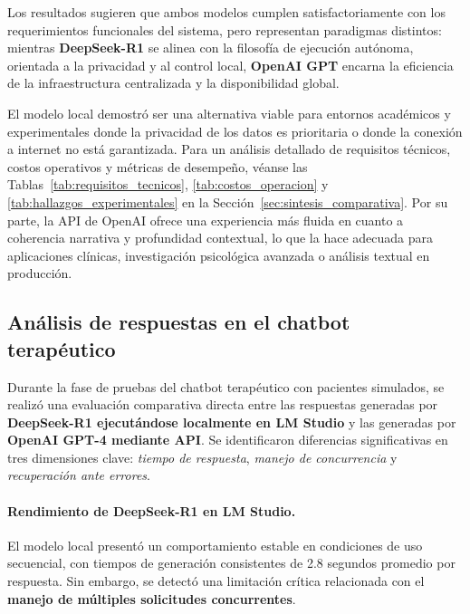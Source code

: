 \documentclass[12pt,a4paper]{report}
\numberwithin{figure}{section}
\begin{document}
Los resultados sugieren que ambos modelos cumplen satisfactoriamente con los requerimientos funcionales del sistema, pero representan paradigmas distintos:  
mientras \textbf{DeepSeek-R1} se alinea con la filosofía de ejecución autónoma, orientada a la privacidad y al control local, \textbf{OpenAI GPT} encarna la eficiencia de la infraestructura centralizada y la disponibilidad global.

El modelo local demostró ser una alternativa viable para entornos académicos y experimentales donde la privacidad de los datos es prioritaria o donde la conexión a internet no está garantizada. Para un análisis detallado de requisitos técnicos, costos operativos y métricas de desempeño, véanse las Tablas~\ref{tab:requisitos_tecnicos}, \ref{tab:costos_operacion} y \ref{tab:hallazgos_experimentales} en la Sección~\ref{sec:sintesis_comparativa}.  
Por su parte, la API de OpenAI ofrece una experiencia más fluida en cuanto a coherencia narrativa y profundidad contextual, lo que la hace adecuada para aplicaciones clínicas, investigación psicológica avanzada o análisis textual en producción.

\vspace{1em}

\subsection[Análisis de respuestas del chatbot]{Análisis de respuestas en el chatbot terapéutico}
\label{subsec:analisis_respuestas_chatbot}

Durante la fase de pruebas del chatbot terapéutico con pacientes simulados, se realizó una evaluación comparativa directa entre las respuestas generadas por \textbf{DeepSeek-R1 ejecutándose localmente en LM Studio} y las generadas por \textbf{OpenAI GPT-4 mediante API}.  
Se identificaron diferencias significativas en tres dimensiones clave: \textit{tiempo de respuesta}, \textit{manejo de concurrencia} y \textit{recuperación ante errores}.

\paragraph{Rendimiento de DeepSeek-R1 en LM Studio.}

El modelo local presentó un comportamiento estable en condiciones de uso secuencial, con tiempos de generación consistentes de 2.8 segundos promedio por respuesta.  
Sin embargo, se detectó una limitación crítica relacionada con el \textbf{manejo de múltiples solicitudes concurrentes}.
\end{document}
